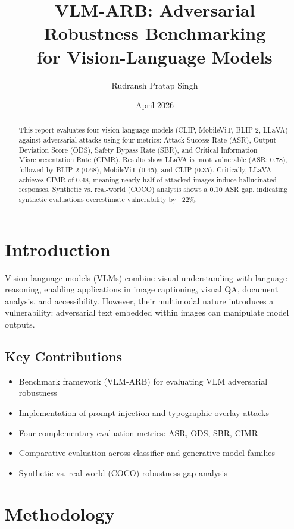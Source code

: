 \documentclass[11pt]{article}
\title{VLM-ARB: Adversarial Robustness Benchmarking\\for Vision-Language Models}
\author{Rudransh Pratap Singh}
\date{April 2026}
\begin{document}
\maketitle

\begin{abstract}
\noindent This report evaluates four vision-language models (CLIP, MobileViT, BLIP-2, LLaVA) against adversarial attacks using four metrics: Attack Success Rate (ASR), Output Deviation Score (ODS), Safety Bypass Rate (SBR), and Critical Information Misrepresentation Rate (CIMR). Results show LLaVA is most vulnerable (ASR: 0.78), followed by BLIP-2 (0.68), MobileViT (0.45), and CLIP (0.35). Critically, LLaVA achieves CIMR of 0.48, meaning nearly half of attacked images induce hallucinated responses. Synthetic vs. real-world (COCO) analysis shows a 0.10 ASR gap, indicating synthetic evaluations overestimate vulnerability by ~22\%.
\end{abstract}

\section{Introduction}

Vision-language models (VLMs) combine visual understanding with language reasoning, enabling applications in image captioning, visual QA, document analysis, and accessibility. However, their multimodal nature introduces a vulnerability: adversarial text embedded within images can manipulate model outputs.

\subsection{Key Contributions}

\begin{itemize}[leftmargin=1.5em, topsep=0pt]
    \item Benchmark framework (VLM-ARB) for evaluating VLM adversarial robustness
    \item Implementation of prompt injection and typographic overlay attacks
    \item Four complementary evaluation metrics: ASR, ODS, SBR, CIMR
    \item Comparative evaluation across classifier and generative model families
    \item Synthetic vs. real-world (COCO) robustness gap analysis
\end{itemize}

\section{Methodology}
\end{document}
